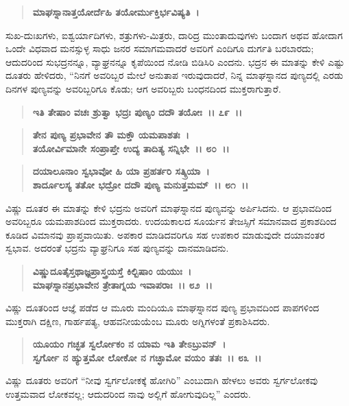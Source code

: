 \begin{verse}
\textbf{ಮಾಘಸ್ನಾನಾತ್ತಯೋರ್ದೆಹಿ ತಯೋರ್ಮುಕ್ತಿರ್ಭವಿಷ್ಯತಿ~।}
\end{verse}

ಸುಖ-ದುಃಖಗಳು, ಐಶ್ವರ್ಯಾದಿಗಳು, ಶತ್ರುಗಳು-ಮಿತ್ರರು, ದಾರಿದ್ರ ಮುಂತಾದುವುಗಳು ಬಂದಾಗ ಅಥವ ಹೋದಾಗ ಒಂದೇ ವಿಧವಾದ ಮನಸ್ಸುಳ್ಳ ಸಾಧು ಜನರ ಸಮಾಗಮವಾದರೆ ಅವರಿಗೆ ಎಂದಿಗೂ ದುರ್ಗತಿ ಬರಬಾರದು; ಆದುದರಿಂದ ಸುಭದ್ರನನ್ನೂ, ವ್ಯಾಘ್ರನನ್ನೂ ಕೃಪೆಯಿಂದ ನೋಡಿ ಬಿಡಿಸಿರಿ ಎಂದನು. ಭದ್ರನ ಈ ಮಾತನ್ನು ಕೇಳಿ ಎಷ್ಟು ದೂತರು ಹೇಳಿದರು, “ನಿನಗೆ ಅವರಿಬ್ಬರ ಮೇಲೆ ಅನುತಾಪ ಇರುವುದಾದರೆ, ನಿನ್ನ ಮಾಘಸ್ನಾನದ ಪುಣ್ಯದಲ್ಲಿ ಎರಡು ದಿನಗಳ ಪುಣ್ಯವನ್ನು ಅವರಿಬ್ಬರಿಗೂ ಕೊಡು; ಆಗ ಅವರಿಬ್ಬರು ಬಂಧನದಿಂದ ಮುಕ್ತರಾಗುತ್ತಾರೆ.

\begin{verse}
\textbf{ಇತಿ ತೇಷಾಂ ವಚಃ ಶ್ರುತ್ವಾ ಭದ್ರಃ ಪುಣ್ಯಂ ದದೌ ತಯೋಃ~।। ೭೯~।।} 
\end{verse}

\begin{verse}
\textbf{ತೇನ ಪುಣ್ಯ ಪ್ರಭಾವೇನ ತೌ ಮಕ್ತೌ ಯಮಪಾಶತಃ~।}\\\textbf{ತಯೋರ್ವಿಮಾನೇ ಸಂಪ್ರಾಪ್ತೇ ಉದ್ಯ ತಾದಿತ್ಯ ಸನ್ನಿಭೇ~।। ೮೦~।। }
\end{verse}

\begin{verse}
\textbf{ದಯಾಲೂನಾಂ ಸ್ವಭಾವೋ ಹಿ ಯಾ ಪ್ರಹರ್ತರಿ ಸತ್ಕ್ರಿಯಾ~।}\\\textbf{ಶಾರ್ದೂಲಸ್ಯ ತತೋ ಭದ್ರೋ ದದೌ ಪುಣ್ಯ ಮನುತ್ತಮಮ್~।। ೮೧~।।}
\end{verse}

ವಿಷ್ಣು ದೂತರ ಈ ಮಾತನ್ನು ಕೇಳಿ ಭದ್ರನು ಅವರಿಗೆ ಮಾಘಸ್ನಾನದ ಪುಣ್ಯವನ್ನು ಅರ್ಪಿಸಿದನು. ಆ ಪ್ರಭಾವದಿಂದ ಅವರಿಬ್ಬರೂ ಯಮಪಾಶದಿಂದ ಮುಕ್ತರಾದರು. ಉದಯಕಾಲದ ಸೂರ್ಯನ ತೇಜಸ್ಸಿಗೆ ಸಮಾನವಾದ ಪ್ರಕಾಶದಿಂದ ಕೂಡಿದ ವಿಮಾನವು ಪ್ರಾಪ್ತವಾಯಿತು. ಅಪಕಾರ ಮಾಡಿದವರಿಗೂ ಸಹ ಉಪಕಾರ ಮಾಡುವುದೇ ದಯಾವಂತರ ಸ್ವಭಾವ. ಅದರಂತೆ ಭದ್ರನು ವ್ಯಾಘ್ರನಿಗೂ ಸಹ ಪುಣ್ಯವನ್ನು ದಾನಮಾಡಿದನು.

\begin{verse}
\textbf{ವಿಷ್ಣುದೂತೈಸ್ತಥಾಜ್ಞಪ್ರಾಸ್ತ್ರಯಸ್ತೆ ಕಿಲ್ಬಿಷಾಂ ಯಯುಃ~।}\\\textbf{ಮಾಘಸ್ನಾನಪ್ರಭಾವೇನ ತ್ರೇತಾಗ್ನಯ ಇವಾಪರಾಃ~।। ೮೨~।।}
\end{verse}

ವಿಷ್ಣು ದೂತರಿಂದ ಆಜ್ಞೆ ಪಡೆದ ಆ ಮೂರು ಮಂದಿಯೂ ಮಾಘಸ್ನಾನದ ಪುಣ್ಯ ಪ್ರಭಾವದಿಂದ ಪಾಪಗಳಿಂದ ಮುಕ್ತರಾಗಿ ದಕ್ಷಿಣ, ಗಾರ್ಹಪತ್ಯ, ಆಹವನೀಯಯೆಂಬ ಮೂರು ಅಗ್ನಿಗಳಂತೆ ಪ್ರಕಾಶಿಸಿದರು.

\begin{verse}
\textbf{ಯೂಯಂ ಗಚ್ಛತ ಸ್ವರ್ಲೋಕಂ ನ ಯಾಮ ಇತಿ ತೇಽಬ್ರುವನ್~।}\\\textbf{ಸ್ವರ್ಗೋ ನ ಹ್ಯುತ್ತಮೋ ಲೋಕೋ ನ ಗಚ್ಛಾಮೋ ವಯಂ ತತಃ~।। ೮೩~।।}
\end{verse}

ವಿಷ್ಣು ದೂತರು ಅವರಿಗೆ “ನೀವು ಸ್ವರ್ಗಲೋಕಕ್ಕೆ ಹೋಗಿರಿ” ಎಂಬುದಾಗಿ ಹೇಳಲು ಅವರು ಸ್ವರ್ಗಲೋಕವು ಉತ್ತಮವಾದ ಲೋಕವಲ್ಲ; ಆದುದರಿಂದ ನಾವು ಅಲ್ಲಿಗೆ ಹೋಗುವುದಿಲ್ಲ” ಎಂದರು.

